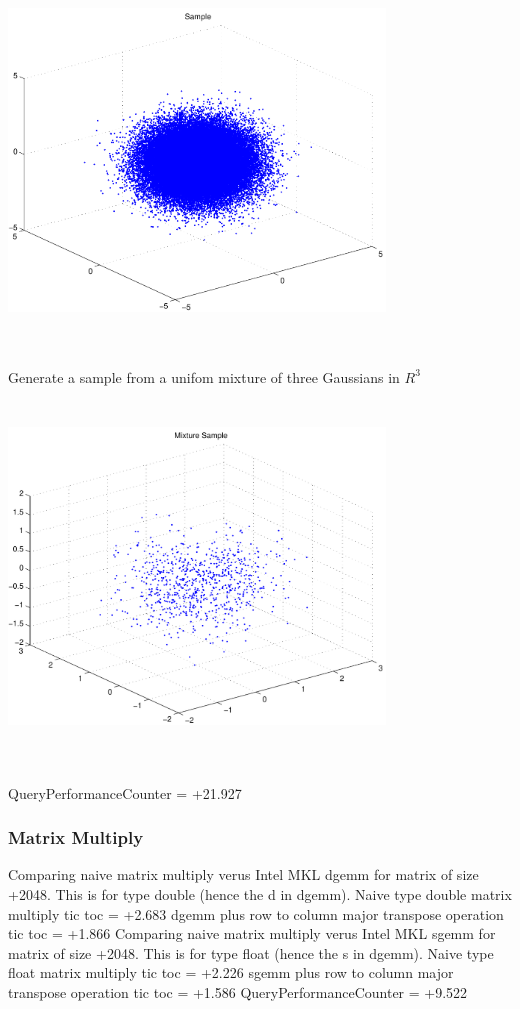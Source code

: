 \documentclass[9pt]{article}
\theoremstyle{plain}
\theoremstyle{definition}
\theoremstyle{remark}
\numberwithin{equation}{section}
\begin{document}
\includegraphics[width=10.0cm,height=10.0cm]{R_3_Normal.pdf}

Generate a sample from a unifom mixture of three Gaussians in $R^3$
\includegraphics[width=10.0cm,height=10.0cm]{R_3_Normal_Mixture.pdf}

QueryPerformanceCounter  =  +21.927
\subsubsection{Matrix Multiply}
Comparing naive matrix multiply verus Intel MKL dgemm for matrix of size +2048.
This is for type double (hence the d in dgemm).
Naive type double matrix multiply tic toc  =  +2.683
dgemm plus row to column major transpose operation tic toc  =  +1.866
Comparing naive matrix multiply verus Intel MKL sgemm for matrix of size +2048.
This is for type float (hence the s in dgemm).
Naive type float matrix multiply tic toc  =  +2.226
sgemm plus row to column major transpose operation tic toc  =  +1.586
QueryPerformanceCounter  =  +9.522
\end{document}
